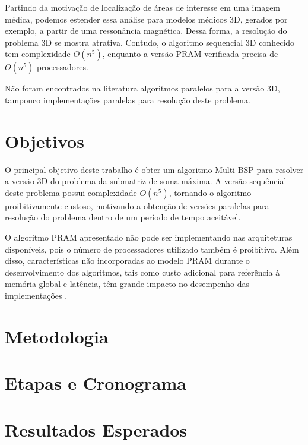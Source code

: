 \documentclass[a4paper, 12pt] {article}
\begin{document}
Partindo da motivação de localização de áreas de interesse em uma imagem médica,
podemos estender essa análise para modelos médicos 3D, gerados por exemplo, a
partir de uma ressonância magnética. Dessa forma, a resolução do problema 3D se
mostra atrativa. Contudo, o algoritmo sequencial 3D conhecido tem complexidade
$O(n^5)$, enquanto a versão PRAM verificada precisa de $O(n^5)$ processadores.

Não foram encontrados na literatura algoritmos paralelos para a versão
3D, tampouco implementações paralelas para resolução deste problema.


\section{Objetivos}

O principal objetivo deste trabalho é obter um algoritmo Multi-BSP para resolver
a versão 3D do problema da submatriz de soma máxima. A versão sequêncial deste
problema possui complexidade $O(n^5)$, tornando o algoritmo proibitivamente
custoso, motivando a obtenção de versões paralelas para resolução do problema
dentro de um período de tempo aceitável.

O algoritmo PRAM apresentado não pode ser implementando nas arquiteturas
disponíveis, pois o número de processadores utilizado também é proibitivo. Além
disso, características não incorporadas ao modelo PRAM durante o
desenvolvimento dos algoritmos, tais como custo adicional para referência à memória global e latência, 
têm grande impacto no desempenho das implementações \cite{castro2003}.



\section{Metodologia}

\section{Etapas e Cronograma}

\section{Resultados Esperados}



\end{document}
